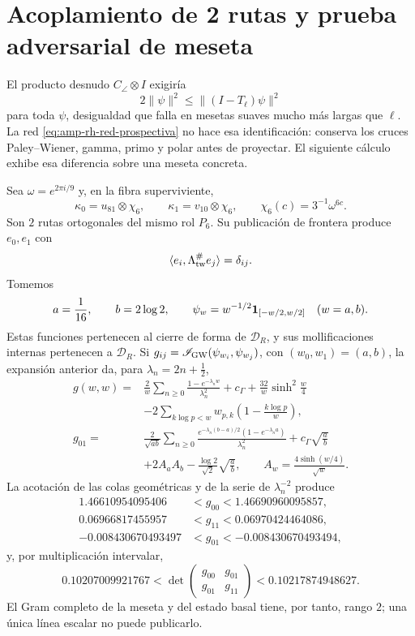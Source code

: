 \section*{Acoplamiento de 2 rutas y prueba adversarial de meseta}

El producto desnudo \(C_\angle\otimes I\) exigiría
\[
 2\|\psi\|^2\leq\|(I-T_\ell)\psi\|^2
\]
para toda \(\psi\), desigualdad que falla en mesetas suaves mucho más
largas que \(\ell\). La red
\eqref{eq:amp-rh-red-prospectiva} no hace esa identificación: conserva
los cruces Paley--Wiener, gamma, primo y polar antes de proyectar. El
siguiente cálculo exhibe esa diferencia sobre una meseta concreta.

Sea \(\omega=e^{2\pi i/9}\) y, en la fibra superviviente,
\[
 \kappa_0=u_{81}\otimes\chi_6,\qquad
 \kappa_1=v_{10}\otimes\chi_6,\qquad
 \chi_6(c)=3^{-1}\omega^{6c}.
\]
Son \(2\) rutas ortogonales del mismo rol \(P_6\). Su publicación de
frontera produce \(e_0,e_1\) con
\[
 \langle e_i,\Lambda_{\rm tw}^{\#}e_j\rangle=\delta_{ij}.
\]
Tomemos
\[
 a=\frac1{16},\qquad b=2\log2,\qquad
 \psi_w=w^{-1/2}{\bf1}_{[-w/2,w/2]}\quad(w=a,b).
\]
Estas funciones pertenecen al cierre de forma de \(\mathcal D_R\), y sus
mollificaciones internas pertenecen a \(\mathcal D_R\). Si
\(g_{ij}=\mathscr I_{\rm GW}(\psi_{w_i},\psi_{w_j})\), con
\((w_0,w_1)=(a,b)\), la expansión anterior da, para
\(\lambda_n=2n+\tfrac12\),
\begin{align}
 g(w,w)
 ={}&\frac2w\sum_{n\geq0}
 \frac{1-e^{-\lambda_nw}}{\lambda_n^2}
 +c_\Gamma+\frac{32}{w}\sinh^2\!\frac w4 \nonumber\\
 &-2\sum_{k\log p<w}
  w_{p,k}\left(1-\frac{k\log p}{w}\right),
 \label{eq:amp-rh-meseta-diagonal}\\
 g_{01}
 ={}&\frac2{\sqrt{ab}}\sum_{n\geq0}
 \frac{e^{-\lambda_n(b-a)/2}(1-e^{-\lambda_na})}{\lambda_n^2}
 +c_\Gamma\sqrt{\frac ab} \nonumber\\
 &+2A_aA_b-\frac{\log2}{\sqrt2}\sqrt{\frac ab},
 \qquad A_w=\frac{4\sinh(w/4)}{\sqrt w}.
 \label{eq:amp-rh-meseta-cruce}
\end{align}
La acotación de las colas geométricas y de la serie de
\(\lambda_n^{-2}\) produce
\begin{align}
 1.46610954095406&<g_{00}<1.46690960095857,\nonumber\\
 0.06966817455957&<g_{11}<0.06970424464086,\nonumber\\
 -0.008430670493497&<g_{01}<-0.008430670493494,
 \label{eq:amp-rh-meseta-cotas}
\end{align}
y, por multiplicación intervalar,
\begin{equation}\label{eq:amp-rh-meseta-determinante}
 0.10207009921767<
 \det\begin{pmatrix}g_{00}&g_{01}\\g_{01}&g_{11}\end{pmatrix}
 <0.10217874948627.
\end{equation}
El Gram completo de la meseta y del estado basal tiene, por tanto, rango
\(2\); una única línea escalar no puede publicarlo.

